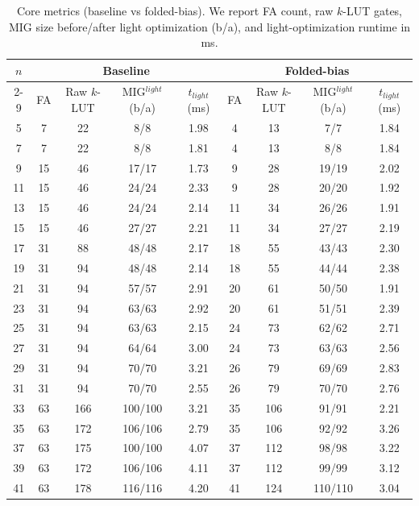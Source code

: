 \begin{table}[t]
\centering
\scriptsize
\setlength{\tabcolsep}{3.2pt}
\renewcommand{\arraystretch}{1.05}
\caption{Core metrics (baseline vs folded-bias). We report FA count, raw $k$-LUT gates, MIG size before/after light optimization (b/a), and light-optimization runtime in ms.}
\label{tab:core_metrics_consolidated}
\begin{tabular}{c|cccc|cccc}
\hline
\multicolumn{1}{c|}{$n$} & \multicolumn{4}{c|}{Baseline} & \multicolumn{4}{c}{Folded-bias} \\
\cline{2-9}
\multicolumn{1}{c|}{} & FA & Raw $k$-LUT & MIG$^{light}$ (b/a) & $t_{light}$ (ms) & FA & Raw $k$-LUT & MIG$^{light}$ (b/a) & $t_{light}$ (ms) \\
\hline
5 & 7 & 22 & 8/8 & 1.98 & 4 & 13 & 7/7 & 1.84 \\
7 & 7 & 22 & 8/8 & 1.81 & 4 & 13 & 8/8 & 1.84 \\
9 & 15 & 46 & 17/17 & 1.73 & 9 & 28 & 19/19 & 2.02 \\
11 & 15 & 46 & 24/24 & 2.33 & 9 & 28 & 20/20 & 1.92 \\
13 & 15 & 46 & 24/24 & 2.14 & 11 & 34 & 26/26 & 1.91 \\
15 & 15 & 46 & 27/27 & 2.21 & 11 & 34 & 27/27 & 2.19 \\
17 & 31 & 88 & 48/48 & 2.17 & 18 & 55 & 43/43 & 2.30 \\
19 & 31 & 94 & 48/48 & 2.14 & 18 & 55 & 44/44 & 2.38 \\
21 & 31 & 94 & 57/57 & 2.91 & 20 & 61 & 50/50 & 1.91 \\
23 & 31 & 94 & 63/63 & 2.92 & 20 & 61 & 51/51 & 2.39 \\
25 & 31 & 94 & 63/63 & 2.15 & 24 & 73 & 62/62 & 2.71 \\
27 & 31 & 94 & 64/64 & 3.00 & 24 & 73 & 63/63 & 2.56 \\
29 & 31 & 94 & 70/70 & 3.21 & 26 & 79 & 69/69 & 2.83 \\
31 & 31 & 94 & 70/70 & 2.55 & 26 & 79 & 70/70 & 2.76 \\
33 & 63 & 166 & 100/100 & 3.21 & 35 & 106 & 91/91 & 2.21 \\
35 & 63 & 172 & 106/106 & 2.79 & 35 & 106 & 92/92 & 3.26 \\
37 & 63 & 175 & 100/100 & 4.07 & 37 & 112 & 98/98 & 3.22 \\
39 & 63 & 172 & 106/106 & 4.11 & 37 & 112 & 99/99 & 3.12 \\
41 & 63 & 178 & 116/116 & 4.20 & 41 & 124 & 110/110 & 3.04 \\

\end{tabular}
\end{table}
